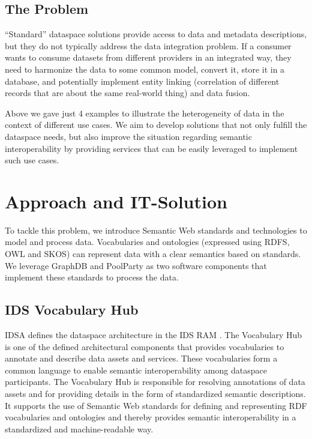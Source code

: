 \documentclass[
  super,
  preprint,
  3p]{elsarticle}
\begin{document}
\subsection{The Problem}\label{the-problem}

``Standard'' dataspace solutions provide access to data and metadata
descriptions, but they do not typically address the data integration
problem. If a consumer wants to consume datasets from different
providers in an integrated way, they need to harmonize the data to some
common model, convert it, store it in a database, and potentially
implement entity linking (correlation of different records that are
about the same real-world thing) and data fusion.

Above we gave just 4 examples to illustrate the heterogeneity of data in
the context of different use cases. We aim to develop solutions that not
only fulfill the dataspace needs, but also improve the situation
regarding semantic interoperability by providing services that can be
easily leveraged to implement such use cases.

\section{Approach and IT-Solution}\label{approach-and-it-solution}

To tackle this problem, we introduce Semantic Web standards and
technologies to model and process data. Vocabularies and ontologies
(expressed using RDFS, OWL and SKOS) can represent data with a clear
semantics based on standards. We leverage GraphDB and PoolParty as two
software components that implement these standards to process the data.

\subsection{IDS Vocabulary Hub}\label{ids-vocabulary-hub}

IDSA defines the dataspace architecture in the IDS RAM
\citep{IDSRAM2024}. The Vocabulary Hub is one of the defined
architectural components that provides vocabularies to annotate and
describe data assets and services. These vocabularies form a common
language to enable semantic interoperability among dataspace
participants. The Vocabulary Hub is responsible for resolving
annotations of data assets and for providing details in the form of
standardized semantic descriptions. It supports the use of Semantic Web
standards for defining and representing RDF vocabularies and ontologies
and thereby provides semantic interoperability in a standardized and
machine-readable way.
\end{document}
